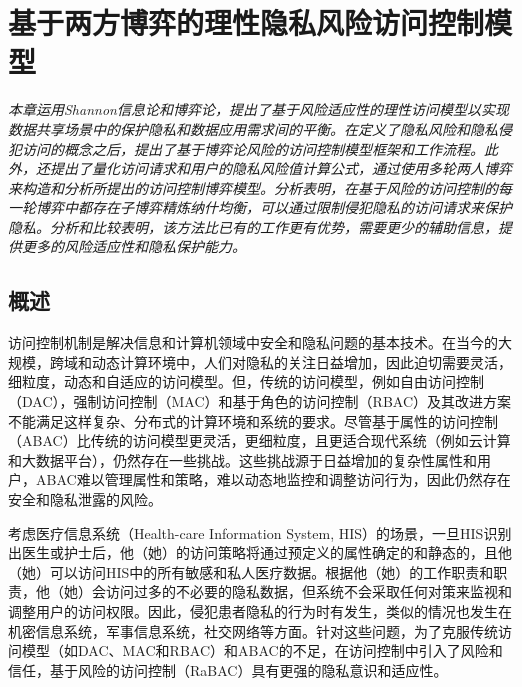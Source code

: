 \chapter{基于两方博弈的理性隐私风险访问控制模型}
\label{chap:game-theoretical-RaBAC-for-privacy}

\textit{}

\textit{本章运用Shannon信息论和博弈论，提出了基于风险适应性的理性访问模型以实现数据共享场景中的保护隐私和数据应用需求间的平衡。在定义了隐私风险和隐私侵犯访问的概念之后，提出了基于博弈论风险的访问控制模型框架和工作流程。此外，还提出了量化访问请求和用户的隐私风险值计算公式，通过使用多轮两人博弈来构造和分析所提出的访问控制博弈模型。分析表明，在基于风险的访问控制的每一轮博弈中都存在子博弈精炼纳什均衡，可以通过限制侵犯隐私的访问请求来保护隐私。分析和比较表明，该方法比已有的工作更有优势，需要更少的辅助信息，提供更多的风险适应性和隐私保护能力。}

\section{概述}

访问控制机制是解决信息和计算机领域中安全和隐私问题的基本技术。在当今的大规模，跨域和动态计算环境中，人们对隐私的关注日益增加，因此迫切需要灵活，细粒度，动态和自适应的访问模型。但，传统的访问模型，例如自由访问控制（DAC）\cite{lampson1974protection}，强制访问控制（MAC）\cite{bell1973secure}和基于角色的访问控制（RBAC）\cite{sandhu1996role}及其改进方案不能满足这样复杂、分布式的计算环境和系统的要求。尽管基于属性的访问控制（ABAC）\cite{kuhn2010adding}比传统的访问模型更灵活，更细粒度，且更适合现代系统（例如云计算和大数据平台），仍然存在一些挑战\cite{servos2017current,paci2018survey}。这些挑战源于日益增加的复杂性属性和用户，ABAC难以管理属性和策略，难以动态地监控和调整访问行为，因此仍然存在安全和隐私泄露的风险。

考虑医疗信息系统（Health-care Information System, HIS）的场景，一旦HIS识别出医生或护士后，他（她）的访问策略将通过预定义的属性确定的和静态的，且他（她）可以访问HIS中的所有敏感和私人医疗数据。根据他（她）的工作职责和职责，他（她）会访问过多的不必要的隐私数据，但系统不会采取任何对策来监视和调整用户的访问权限。因此，侵犯患者隐私的行为时有发生，类似的情况也发生在机密信息系统，军事信息系统，社交网络等方面。针对这些问题，为了克服传统访问模型（如DAC、MAC和RBAC）和ABAC的不足，在访问控制中引入了风险\cite{cheng2007fuzzy, zhang2018privacy}和信任\cite{dimmock2004using, pustchi2015mt}，基于风险的访问控制（RaBAC）\cite{cheng2007fuzzy}具有更强的隐私意识和适应性\cite{ni2010risk, wang2011quantified, zhang2018privacy}。


